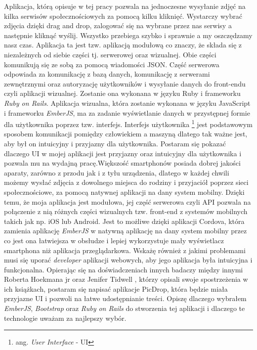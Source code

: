 \documentclass[brudnopis]{xmgr}
\begin{document}
Aplikacja, którą opisuje w tej pracy pozwala na jednoczesne wysyłanie zdjęć na kilka serwisów społecznościowych za pomocą kilku kliknięć. Wystarczy wybrać zdjęcia dzięki drag and drop, zalogować się na wybrane przez nas serwisy a następnie kliknąć wyślij. Wszystko przebiega szybko i sprawnie a my oszczędzamy nasz czas.  Aplikacja ta jest tzw. aplikacją modułową co znaczy, że składa się z  niezależnych od siebie części tj. serwerowej oraz wizualnej. Obie części komunikują się ze sobą za pomocą wiadomości JSON. Część serwerowa odpowiada za komunikację z bazą danych, komunikację z serwerami zewnętrznymi oraz autoryzację użytkowników i wysyłanie danych do front-endu czyli aplikacji wizualnej. Zostanie ona wykonana w języku Ruby i frameworku \textit{Ruby on Rails}.   Aplikacja wizualna, która zostanie wykonana w języku JavaScript i frameworku \textit{EmberJS}, ma za zadanie wyświetlanie danych w przystępnej formie dla użytkownika poprzez tzw. interfejs. Interfejs użytkownika \footnote{ang. \textit{User Interface} - UI}  jest podstawowym sposobem komunikacji pomiędzy człowiekiem a maszyną dlatego tak ważne jest, aby był on intuicyjny i przyjazny dla użytkownika. Postaram się pokazać dlaczego UI w mojej aplikacji jest przyjazny oraz intuicyjny dla użytkownika i pozwala mu na wydajną pracę.Większość smartphonów posiada dobrej jakości aparaty, zarówno z przodu jak i z tyłu urządzenia, dlatego w każdej chwili możemy wysłać zdjęcia z dowolnego miejsca do rodziny i przyjaciół poprzez sieci społecznościowe, za pomocą natywnej aplikacji na dany system mobilny. Dzięki temu, że moja aplikacja jest modułowa, jej część serwerowa czyli API pozwala na połączenie z nią różnych części wizualnych tzw. front-end z systemów mobilnych takich jak np. iOS lub Android. Jest to możliwe dzięki aplikacji Cordova, która zamienia aplikację \textit{EmberJS} w natywną aplikację na dany system mobilny przez co jest ona łatwiejsza w obsłudze i lepiej wykorzystuje mały wyświetlacz smartphona niż aplikacja przeglądarkowa. Wskażę również z jakimi problemami musi się uporać \textit{developer} aplikacji webowych, aby jego aplikacja była intuicyjna i funkcjonalna. Opierając się na  doświadczeniach innych badaczy  między innymi Roberta Hoekmana jr  \cite {magiaUI} oraz Jenifer Tidwell  \cite {projektowanieUI}, którzy opisali swoje spostrzeżenia w ich książkach, postaram się napisać aplikacje PicDrop, która  będzie miała przyjazne UI i pozwoli na łatwe udostępnianie treści. Opiszę dlaczego wybrałem \textit{EmberJS}, \textit{Bootstrap} oraz \textit{Ruby on Rails} do stworzenia tej aplikacji i dlaczego te technologie uważam za najlepszy wybór.
\end{document}
